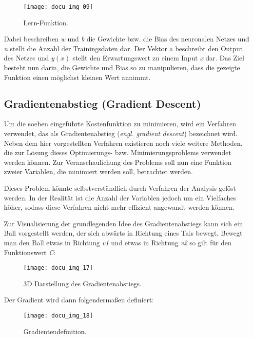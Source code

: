 \begin{figure}[h]
    \centering
    \texttt{[image: docu\_img\_09]}
    \caption{Lern-Funktion.}
    \label{fig:learn-function}
\end{figure}

Dabei beschreiben \textit{w} und \textit{b} die Gewichte bzw. die Bias des neuronalen Netzes und \textit{n} stellt die Anzahl der Trainingsdaten
dar. Der Vektor a beschreibt den Output des Netzes und \textit{\(y(x)\)} stellt den Erwartungswert zu einem Input \textit{x} dar.
Das Ziel besteht nun darin, die Gewichte und Bias so zu manipulieren, dass die gezeigte Funktion einen möglichst kleinen
Wert annimmt.

\subsection{Gradientenabstieg (Gradient Descent)}

Um die soeben eingeführte Kostenfunktion zu minimieren, wird ein Verfahren verwendet, das als Gradientenabstieg (\textit{engl.
gradient descent}) bezeichnet wird. Neben dem hier vorgestellten Verfahren existieren noch viele weitere Methoden, die
zur Lösung dieses Optimierungs- bzw. Minimierungsproblems verwendet werden können.
Zur Veranschaulichung des Problems soll nun eine Funktion zweier Variablen, die minimiert werden soll, betrachtet werden.

Dieses Problem könnte selbstverständlich durch Verfahren der Analysis gelöst werden. In der Realität ist die Anzahl der
Variablen jedoch um ein Vielfaches höher, sodass diese Verfahren nicht mehr effizient angewandt werden können.

Zur Visualisierung der grundlegenden Idee des Gradientenabstiegs kann sich ein Ball vorgestellt werden, der sich abwärts
in Richtung eines Tals bewegt. Bewegt man den Ball etwas in Richtung \textit{v1} und etwas in Richtung \textit{v2}
so gilt für den Funktionswert \textit{C}:

\begin{figure}[h]
    \centering
    \texttt{[image: docu\_img\_17]}
    \caption{3D Darstellung des Gradientenabstiegs.}
    \label{fig:gradient-decent-3d}
\end{figure}

Der Gradient wird dann folgendermaßen definiert:

\begin{figure}[h]
    \centering
    \texttt{[image: docu\_img\_18]}
    \caption{Gradientendefinition.}
    \label{fig:gradient-decent-definition}
\end{figure}

